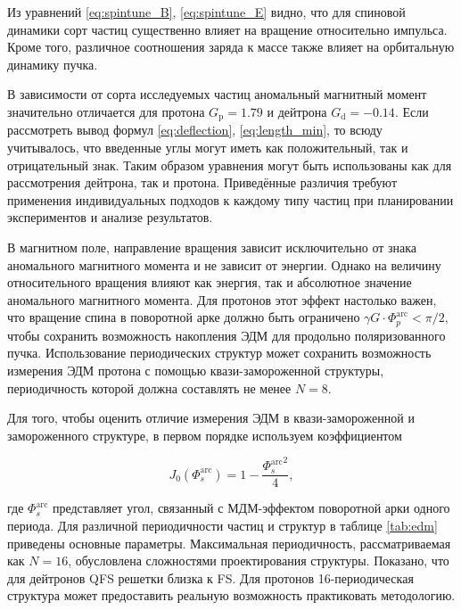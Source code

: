 \par Из уравнений \ref{eq:spintune_B}, \ref{eq:spintune_E} видно, что для спиновой динамики сорт частиц существенно влияет на вращение относительно импульса. Кроме того, различное соотношения заряда к массе также влияет на орбитальную динамику пучка.

\par В зависимости от сорта исследуемых частиц аномальный магнитный момент значительно отличается для протона $G_{\textrm{p}}=1.79$ и дейтрона $G_{\textrm{d}}=-0.14$. Если рассмотреть вывод формул \ref{eq:deflection}, \ref{eq:length_min}, то всюду учитывалось, что введенные углы могут иметь как положительный, так и отрицательный знак. Таким образом уравнения могут быть использованы как для рассмотрения дейтрона, так и протона. Приведённые различия требуют применения индивидуальных подходов к каждому типу частиц при планировании экспериментов и анализе результатов.

\par  В магнитном поле, направление вращения зависит исключительно от знака аномального магнитного момента и не зависит от энергии. Однако на величину относительного вращения влияют как энергия, так и абсолютное значение аномального магнитного момента. Для протонов этот эффект настолько важен, что вращение спина в поворотной арке должно быть ограничено $\gamma G \cdot \Phi_{p}^{\text{arc}} < \pi/2$, чтобы сохранить возможность накопления ЭДМ для продольно поляризованного пучка. Использование периодических структур может сохранить возможность измерения ЭДМ протона с помощью квази-замороженной структуры, периодичность которой должна составлять не менее $N=8$.
\par Для того, чтобы оценить отличие измерения ЭДМ в квази-замороженной и замороженного структуре, в первом порядке используем коэффициентом \cite{Senichev:2023_nuclotron} 

\begin{equation}
	J_{0}(\Phi_s^{\textrm{arc}})=1-\frac{{\Phi_s^{\textrm{arc}}}^2}{4},
	\label{eq:edm}
\end{equation}

\noindent где $\Phi_s^{\textrm{arc}}$ представляет угол, связанный с МДМ-эффектом поворотной арки одного периода. Для различной периодичности частиц и структур в таблице \ref{tab:edm} приведены основные параметры. Максимальная периодичность, рассматриваемая как $N=16$, обусловлена сложностями проектирования структуры. Показано, что для дейтронов QFS решетки близка к FS. Для протонов 16-периодическая структура может предоставить реальную возможность практиковать методологию.

